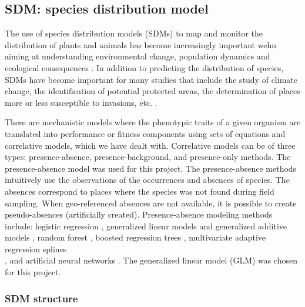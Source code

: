 \documentclass[12pt,a4paper]{article}
\begin{document}
\subsection{SDM: species distribution model} 
The use of species distribution models (SDMs) to map and monitor the distribution of plants and animals has become increasingly important wehn aiming at understanding environmental change, population dynamics and ecological consequences \citep{mil}.
In addition to predicting the distribution of species, SDMs have become important for many studies that include the study of climate change, the identification of potential protected areas, the determination of places more or less susceptible to invasions, etc. \citep{mil}.

There are mechanistic models where the phenotypic traits of a given organism are translated into performance or fitness components using sets of equations and correlative models, which we have dealt with.
Correlative models can be of three types: presence-absence, presence-background, and presence-only methods.
The presence-absence model was used for this project.
The presence-absence methods intuitively use the observations of the occurrences and absences of species. The absences correspond to places where the species was not found during field sampling. When geo-referenced absences are not available, it is possible to create pseudo-absences (artificially created).
Presence-absence modeling methods include: logistic regression \citep{bri}, generalized linear models and generalized additive models \citep{guis}, random forest \citep{brei}, boosted regression trees \citep{Eli}, multivariate adaptive regression splines \\ \citep{mois}, and artificial neural networks \citep{tarr}.
The generalized linear model (GLM) was chosen for this project.
\subsubsection{SDM structure}
\end{document}
